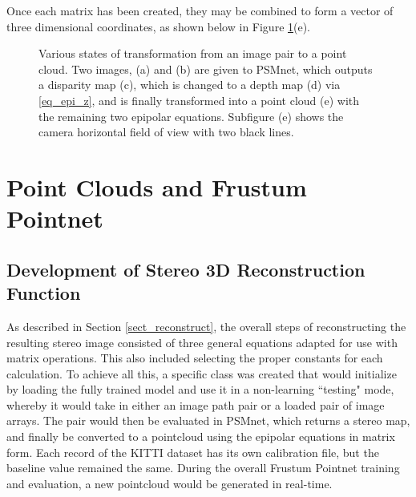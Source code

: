 Once each matrix has been created, they may be combined to form a vector of three dimensional coordinates, as shown below in Figure \ref{reconstruction}(e). 

\begin{figure}[H]
    \centering
    \caption{Various states of transformation from an image pair to a point cloud. Two images, (a) and (b) are given to PSMnet, which outputs a disparity map (c), which is changed to a depth map (d) via \ref{eq_epi_z}, and is finally transformed into a point cloud (e) with the remaining two epipolar equations. Subfigure (e) shows the camera horizontal field of view with two black lines.}
    \label{reconstruction}
\end{figure}






\newpage
\section{Point Clouds and Frustum Pointnet} %
\label{sect_fpnet}
\subsection{Development of Stereo 3D Reconstruction Function}
As described in Section \ref{sect_reconstruct}, the overall steps of reconstructing the resulting stereo image consisted of three general equations adapted for use with matrix operations. This also included selecting the proper constants for each calculation. To achieve all this, a specific class was created that would initialize by loading the fully trained model and use it in a non-learning ``testing" mode, whereby it would take in either an image path pair or a loaded pair of image arrays. The pair would then be evaluated in PSMnet, which returns a stereo map, and finally be converted to a pointcloud using the epipolar equations in matrix form. Each record of the KITTI dataset has its own calibration file, but the baseline value remained the same. During the overall Frustum Pointnet training and evaluation, a new pointcloud would be generated in real-time.

